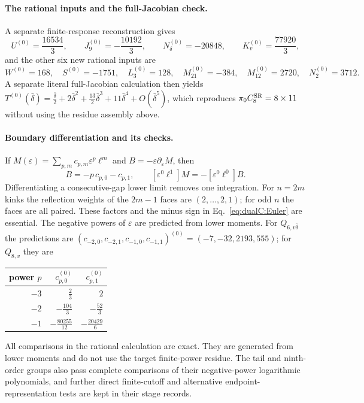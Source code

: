 \documentclass[11pt,a4paper]{article}
\numberwithin{equation}{section}
\newcommand{\CSR}{C^{\rm SR}}
\newcommand{\db}{\bar\delta}
\begin{document}
\paragraph{The rational inputs and the full-Jacobian check.} A separate finite-response reconstruction gives
\begin{equation}
 U^{(0)}=\frac{16534}{3},\qquad J_9^{(0)}=-\frac{10192}{3},\qquad N_\delta^{(0)}=-20848,\qquad K_v^{(0)}=\frac{77920}{3},
\end{equation}
and the other six new rational inputs are
\begin{equation}
 W^{(0)}=168,\quad S^{(0)}=-1751,\quad L_3^{(0)}=128,\quad M_{21}^{(0)}=-384,\quad M_{12}^{(0)}=2720,\quad
 N_2^{(0)}=3712.
\end{equation}
A separate literal full-Jacobian calculation then yields
$T^{(0)}(\db)=\frac{\db}{2}+2\db^2+\frac{13}{2}\db^3+11\db^4+O(\db^5)$, which reproduces $\pi_0\CSR_8=8\times11$ without
using the residue assembly above.

\paragraph{Boundary differentiation and its checks.} If $M(\varepsilon)=\sum_{p,m}c_{p,m}\varepsilon^p\ell^m$ and
$B=-\varepsilon\partial_\varepsilon M$, then
\begin{equation}
 [\varepsilon^p\ell^0]B=-p\,c_{p,0}-c_{p,1},\qquad [\varepsilon^0\ell^1]M=-[\varepsilon^0\ell^0]B.
 \label{eq:dualC:Euler}
\end{equation}
Differentiating a consecutive-gap lower limit removes one integration. For $n=2m$ kinks the reflection weights of the
$2m-1$ faces are $(2,\ldots,2,1)$; for odd $n$ the faces are all paired. These factors and the minus sign in
Eq.~\eqref{eq:dualC:Euler} are essential. The negative powers of $\varepsilon$ are predicted from lower moments. For
$Q_{6,v\db}$ the predictions are $(c_{-2,0},c_{-2,1},c_{-1,0},c_{-1,1})^{(0)}=(-7,-32,2193,555)$; for $Q_{8,v}$ they are
\begin{center}\small
\begin{tabular}{@{}rrr@{}}
\toprule
power $p$ & $c_{p,0}^{(0)}$ & $c_{p,1}^{(0)}$\\
\midrule
$-3$ & $\frac23$ & $2$\\[2pt]
$-2$ & $-\frac{104}{3}$ & $-\frac{52}{3}$\\[2pt]
$-1$ & $-\frac{80255}{12}$ & $-\frac{20429}{6}$\\
\bottomrule
\end{tabular}
\end{center}
All comparisons in the rational calculation are exact. They are generated from lower moments and do not use the target
finite-power residue. The tail and ninth-order groups also pass complete comparisons of their negative-power
logarithmic polynomials, and further direct finite-cutoff and alternative endpoint-representation tests are kept in
their stage records.
\end{document}
